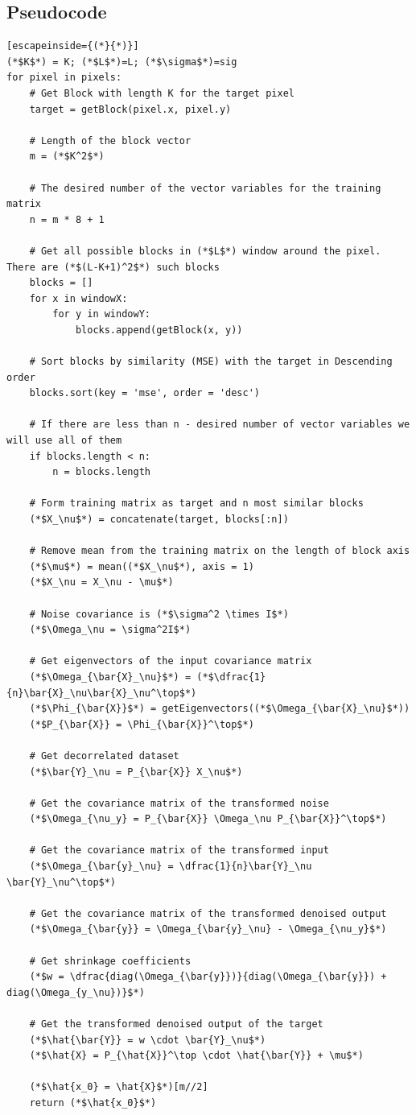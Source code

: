 \subsection{Pseudocode}
\begin{lstlisting}[escapeinside={(*}{*)}]
(*$K$*) = K; (*$L$*)=L; (*$\sigma$*)=sig
for pixel in pixels:
    # Get Block with length K for the target pixel
    target = getBlock(pixel.x, pixel.y)
    
    # Length of the block vector
    m = (*$K^2$*)
    
    # The desired number of the vector variables for the training matrix
    n = m * 8 + 1 

    # Get all possible blocks in (*$L$*) window around the pixel. There are (*$(L-K+1)^2$*) such blocks
    blocks = []
    for x in windowX: 
        for y in windowY:
            blocks.append(getBlock(x, y))
    
    # Sort blocks by similarity (MSE) with the target in Descending order
    blocks.sort(key = 'mse', order = 'desc')

    # If there are less than n - desired number of vector variables we will use all of them
    if blocks.length < n:
        n = blocks.length
    
    # Form training matrix as target and n most similar blocks
    (*$X_\nu$*) = concatenate(target, blocks[:n])

    # Remove mean from the training matrix on the length of block axis
    (*$\mu$*) = mean((*$X_\nu$*), axis = 1)
    (*$X_\nu = X_\nu - \mu$*)

    # Noise covariance is (*$\sigma^2 \times I$*)
    (*$\Omega_\nu = \sigma^2I$*)

    # Get eigenvectors of the input covariance matrix
    (*$\Omega_{\bar{X}_\nu}$*) = (*$\dfrac{1}{n}\bar{X}_\nu\bar{X}_\nu^\top$*)
    (*$\Phi_{\bar{X}}$*) = getEigenvectors((*$\Omega_{\bar{X}_\nu}$*))
    (*$P_{\bar{X}} = \Phi_{\bar{X}}^\top$*)
    
    # Get decorrelated dataset
    (*$\bar{Y}_\nu = P_{\bar{X}} X_\nu$*)

    # Get the covariance matrix of the transformed noise
    (*$\Omega_{\nu_y} = P_{\bar{X}} \Omega_\nu P_{\bar{X}}^\top$*)

    # Get the covariance matrix of the transformed input
    (*$\Omega_{\bar{y}_\nu} = \dfrac{1}{n}\bar{Y}_\nu \bar{Y}_\nu^\top$*)
    
    # Get the covariance matrix of the transformed denoised output
    (*$\Omega_{\bar{y}} = \Omega_{\bar{y}_\nu} - \Omega_{\nu_y}$*)
    
    # Get shrinkage coefficients
    (*$w = \dfrac{diag(\Omega_{\bar{y}})}{diag(\Omega_{\bar{y}}) + diag(\Omega_{y_\nu})}$*)
    
    # Get the transformed denoised output of the target
    (*$\hat{\bar{Y}} = w \cdot \bar{Y}_\nu$*)
    (*$\hat{X} = P_{\hat{X}}^\top \cdot \hat{\bar{Y}} + \mu$*)
    
    (*$\hat{x_0} = \hat{X}$*)[m//2]
    return (*$\hat{x_0}$*)
\end{lstlisting}

